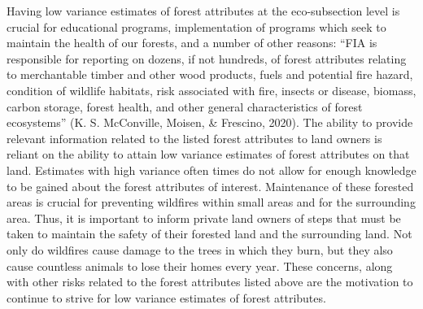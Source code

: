 \documentclass[12pt,twoside]{reedthesis}
\begin{document}
Having low variance estimates of forest attributes at the eco-subsection level is crucial for educational programs, implementation of programs which seek to maintain the health of our forests, and a number of other reasons: ``FIA is responsible for reporting on dozens, if not hundreds, of forest attributes relating to merchantable timber and other wood products, fuels and potential fire hazard, condition of wildlife habitats, risk associated with fire, insects or disease, biomass, carbon storage, forest health, and other general characteristics of forest ecosystems'' (K. S. McConville, Moisen, \& Frescino, 2020). The ability to provide relevant information related to the listed forest attributes to land owners is reliant on the ability to attain low variance estimates of forest attributes on that land. Estimates with high variance often times do not allow for enough knowledge to be gained about the forest attributes of interest. Maintenance of these forested areas is crucial for preventing wildfires within small areas and for the surrounding area. Thus, it is important to inform private land owners of steps that must be taken to maintain the safety of their forested land and the surrounding land. Not only do wildfires cause damage to the trees in which they burn, but they also cause countless animals to lose their homes every year. These concerns, along with other risks related to the forest attributes listed above are the motivation to continue to strive for low variance estimates of forest attributes.
\end{document}
